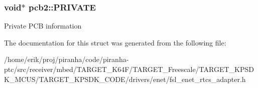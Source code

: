 \subsubsection[{\texorpdfstring{P\+R\+I\+V\+A\+TE}{PRIVATE}}]{\setlength{\rightskip}{0pt plus 5cm}void$\ast$ pcb2\+::\+P\+R\+I\+V\+A\+TE}\hypertarget{structpcb2_a714000014622ace6d632fc74cf117e00}{}\label{structpcb2_a714000014622ace6d632fc74cf117e00}
Private P\+CB information 

The documentation for this struct was generated from the following file\+:\begin{DoxyCompactItemize}
\item 
/home/erik/proj/piranha/code/piranha-\/ptc/src/receiver/mbed/\+T\+A\+R\+G\+E\+T\+\_\+\+K64\+F/\+T\+A\+R\+G\+E\+T\+\_\+\+Freescale/\+T\+A\+R\+G\+E\+T\+\_\+\+K\+P\+S\+D\+K\+\_\+\+M\+C\+U\+S/\+T\+A\+R\+G\+E\+T\+\_\+\+K\+P\+S\+D\+K\+\_\+\+C\+O\+D\+E/drivers/enet/fsl\+\_\+enet\+\_\+rtcs\+\_\+adapter.\+h\end{DoxyCompactItemize}
